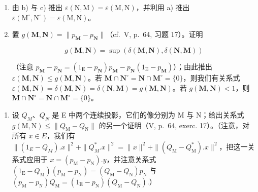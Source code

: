 \begin{enumerate}
\[
\varepsilon (\mathbf {M}, \mathbf {N}) ^ {2} + c (v _ {\mathbf {N M}}) ^ {2} = 1
\]

（注意 \(\|u_{\mathrm{NM}}(x)\|^{2} + \|v_{\mathrm{NM}}(x)\|^{2} = \|p_{\mathrm{M}} \cdot x\|^{2}\)，且 \(v_{NM}\) 的核是 \(M^{\circ} + (M \cap N^{\circ})\)，并由此推出 \(\langle u_{NM}\rangle^{2} \leqslant 1 - c(v_{\mathrm{NM}})^{2}\)。）
\item
  由 b) 与 c) 推出 \(\varepsilon(\mathrm{N}, \mathrm{M}) = \varepsilon(\mathrm{M}, \mathrm{N})\)，并利用 a) 推出 \(\varepsilon(\mathrm{M}^{\circ}, \mathrm{N}^{\circ}) = \varepsilon(\mathrm{M}, \mathrm{N})\)。
\item
  置 \(g(\mathbf{M}, \mathbf{N}) = \|p_{\mathbf{M}} - p_{\mathbf{N}}\|\)（cf.~V, p.~64, 习题 17）。证明

\[
g (\mathbf {M}, \mathbf {N}) = \sup (\delta (\mathbf {M}, \mathbf {N}), \delta (\mathbf {N}, \mathbf {M}))
\]

（注意 \(p_{\mathbf{M}} - p_{\mathbf{N}} = (1_{\mathrm{E}} - p_{\mathbf{N}})p_{\mathbf{M}} - p_{\mathbf{N}}(1_{\mathrm{E}} - p_{\mathbf{M}})\)）；由此推出 \(\varepsilon (\mathbf{M},\mathbf{N})\leqslant g(\mathbf{M},\mathbf{N})\)。若 \(\mathbf{M}\cap \mathbf{N}^{\circ} = \mathbf{N}\cap \mathbf{M}^{\circ} = \{0\}\)，则我们有关系式 \(\varepsilon (\mathbf{M},\mathbf{N}) = \delta (\mathbf{M},\mathbf{N}) = \delta (\mathbf{N},\mathbf{M}) = g(\mathbf{M},\mathbf{N})\)。若 \(g(\mathbf{M},\mathbf{N}) < 1\)，则 \(\mathbf{M}\cap \mathbf{N}^{\circ} = \mathbf{N}\cap \mathbf{M}^{\circ} = \{0\}\)。

\end{enumerate}

\begin{enumerate}
\def\labelenumi{\alph{enumi})}
\setcounter{enumi}{5}
\tightlist
\item
  设 \(Q_{M}\)、\(Q_{N}\) 是 E 中两个连续投影，它们的像分别为 M 与 N；给出关系式 \(g(\mathrm{M}, \mathrm{N}) \leqslant \|Q_{\mathrm{M}} - Q_{\mathrm{N}}\|\) 的另一个证明（V, p.~64, exerc. 17）。（注意，对所有 \(x \in E\)，我们有 \(\|(1_{E} - Q_{M}).x\|^{2} + \|Q_{M}^{*}.x\|^{2} = \|x\|^{2} + \|(Q_{\mathrm{M}} - Q_{\mathrm{M}}^{*}).x\|^{2}\)，把这一关系式应用于 \(x = (p_{\mathrm{M}} - p_{\mathrm{N}}).y\)，并注意关系式 \((1_{\mathrm{E}} - Q_{\mathrm{M}})(p_{\mathrm{M}} - p_{\mathrm{N}}) = (Q_{\mathrm{M}} - Q_{\mathrm{N}}) p_{\mathrm{N}}\) 与 \((p_{\mathrm{M}} - p_{\mathrm{N}}) Q_{\mathrm{M}} = (1_{\mathrm{E}} - p_{\mathrm{N}})(Q_{\mathrm{M}} - Q_{\mathrm{N}}).\)）
\end{enumerate}

